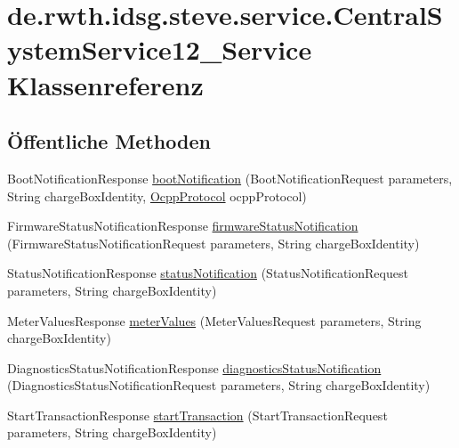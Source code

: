 \hypertarget{classde_1_1rwth_1_1idsg_1_1steve_1_1service_1_1_central_system_service12___service}{\section{de.\-rwth.\-idsg.\-steve.\-service.\-Central\-System\-Service12\-\_\-\-Service Klassenreferenz}
\label{classde_1_1rwth_1_1idsg_1_1steve_1_1service_1_1_central_system_service12___service}
}
\subsection*{Öffentliche Methoden}
\begin{DoxyCompactItemize}
\item 
Boot\-Notification\-Response \hyperlink{classde_1_1rwth_1_1idsg_1_1steve_1_1service_1_1_central_system_service12___service_a314eb1412d6594316923c548631eb470}{boot\-Notification} (Boot\-Notification\-Request parameters, String charge\-Box\-Identity, \hyperlink{enumde_1_1rwth_1_1idsg_1_1steve_1_1ocpp_1_1_ocpp_protocol}{Ocpp\-Protocol} ocpp\-Protocol)
\item 
Firmware\-Status\-Notification\-Response \hyperlink{classde_1_1rwth_1_1idsg_1_1steve_1_1service_1_1_central_system_service12___service_ac663d9f960b1a5c8f4e1d667613573f0}{firmware\-Status\-Notification} (Firmware\-Status\-Notification\-Request parameters, String charge\-Box\-Identity)
\item 
Status\-Notification\-Response \hyperlink{classde_1_1rwth_1_1idsg_1_1steve_1_1service_1_1_central_system_service12___service_a70def548308d0f0109ab2416739ea397}{status\-Notification} (Status\-Notification\-Request parameters, String charge\-Box\-Identity)
\item 
Meter\-Values\-Response \hyperlink{classde_1_1rwth_1_1idsg_1_1steve_1_1service_1_1_central_system_service12___service_a0150028cdc98be759dcd47318459bead}{meter\-Values} (Meter\-Values\-Request parameters, String charge\-Box\-Identity)
\item 
Diagnostics\-Status\-Notification\-Response \hyperlink{classde_1_1rwth_1_1idsg_1_1steve_1_1service_1_1_central_system_service12___service_a13aa6d74925c5b701cf56b1f29671302}{diagnostics\-Status\-Notification} (Diagnostics\-Status\-Notification\-Request parameters, String charge\-Box\-Identity)
\item 
Start\-Transaction\-Response \hyperlink{classde_1_1rwth_1_1idsg_1_1steve_1_1service_1_1_central_system_service12___service_a7a89e52be0598991316dce0e6c5d9608}{start\-Transaction} (Start\-Transaction\-Request parameters, String charge\-Box\-Identity)

\end{DoxyCompactItemize}
